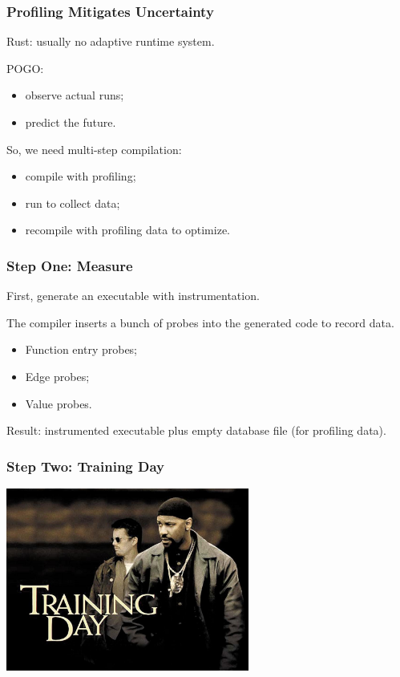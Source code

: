 \begin{frame}
\frametitle{Profiling Mitigates Uncertainty}



Rust: usually no adaptive runtime system.

POGO:
\begin{itemize}
\item observe actual runs;
\item predict the future.
\end{itemize}

So, we need multi-step compilation:
\begin{itemize}
\item compile with profiling;
\item run to collect data;
\item recompile with profiling data to optimize.
\end{itemize}



\end{frame}



\begin{frame}
\frametitle{Step One: Measure}



First, generate an executable with instrumentation. 

The compiler inserts a bunch of probes into the generated code to record data. 
\begin{itemize}
\item Function entry probes;
\item Edge probes;
\item Value probes.
\end{itemize}

Result: instrumented executable plus empty database file (for profiling data).


\end{frame}



\begin{frame}
\frametitle{Step Two: Training Day}

\begin{center}
	\includegraphics[width=0.6\textwidth]{images/training-day.jpg}
\end{center}

\end{frame}


